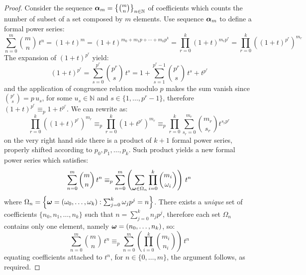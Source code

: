 \begin{proof}
    Consider the sequence $\boldsymbol{\alpha}_{m}=\left\lbrace{{m}\choose{n}}\right\rbrace_{n\in\mathbb{N}}$ 
    of coefficients which counts the number of subset
    of a set composed by $m$ elements. Use sequence $\boldsymbol{\alpha}_{m}$ to define a formal power series:
    \begin{displaymath}
            \sum_{n=0}^{m}{{{m}\choose{n}}\,t^{n}} %
                = \left(1+t\right)^{m}
                = \left(1+t\right)^{m_{0}+m_{1}p+\cdots+m_{k}p^{k}}%
                = \prod_{r=0}^{k}{{\left(1+t\right)^{m_{r}p^{r}}}}
                = \prod_{r=0}^{k}{\left(\left(1+t\right)^{p^{r}}\right)^{m_{r}}}
    \end{displaymath}
    The expansion of $\left(1+t\right)^{p^{r}}$ yield: 
    \begin{displaymath}
            \left(1+t\right)^{p^{r}} = \sum_{s=0}^{p^{r}}{{{p^{r}}\choose{s}}\,t^{s}}
                = 1+\sum_{s=1}^{p^{r}-1}{{{p^{r}}\choose{s}}\,t^{s}}+t^{p^{r}}
    \end{displaymath}
    and the application of congruence relation modulo $p$ makes the sum vanish since ${{p^{r}}\choose{s}}=p\,u_{s}$,
    for some $u_{s}\in\mathbb{N}$ and $s\in\lbrace 1,\ldots,p^{r}-1\rbrace$, 
    therefore $\left(1+t\right)^{p^{r}} \equiv_{p} 1+t^{p^{r}}$. We can rewrite as:
    \begin{displaymath}
            \prod_{r=0}^{k}{\left(\left(1+t\right)^{p^{r}}\right)^{m_{r}}}
                \equiv_{p} \prod_{r=0}^{k}{\left(1+t^{p^{r}}\right)^{m_{r}}}
                \equiv_{p} \prod_{r=0}^{k}{\sum_{s_{r}=0}^{m_{r}}{{{m_{r}}\choose{s_{r}}}t^{s_{r}p^{r}}}}
    \end{displaymath}
    on the very right hand side there is a product of $k+1$ formal power series, properly shifted according to 
    $p_{0},p_{1},\ldots,p_{k}$. Such product yields a new formal power series which satisfies:
    \begin{displaymath}
        \sum_{n=0}^{m}{{{m}\choose{n}}\,t^{n}} 
        \equiv_{p}
        \sum_{n=0}^{m}{\left(\sum_{\boldsymbol{\omega}\in\Omega_{n}}{\prod_{i=0}^{k}{{{m_{i}}\choose{\omega_{i}}}}}\right)\,t^{n}}
    \end{displaymath}
    where $\Omega_{n}=\left\lbrace\boldsymbol{\omega}=\left(\omega_{0},\ldots,\omega_{k}\right):
        \sum_{j=0}^{k}{\omega_{j}p^{j}}=n\right\rbrace$.
    There exists a \emph{unique} set of coefficients
    $\lbrace n_{0},n_{1},\ldots,n_{k}\rbrace$ such that $n=\sum_{j=0}^{k}{n_{j}p^{j}}$, therefore
    each set $\Omega_{n}$ contains only one element, namely $\boldsymbol{\omega}=(n_{0},\ldots,n_{k})$, so:
    \begin{displaymath}
        \sum_{n=0}^{m}{{{m}\choose{n}}\,t^{n}} 
        \equiv_{p} \sum_{n=0}^{m}{\left({\prod_{i=0}^{k}{{{m_{i}}\choose{n_{i}}}}}\right)\,t^{n}}
    \end{displaymath}
    equating coefficients attached to $t^{n}$, for $n\in\lbrace0,\ldots,m\rbrace$, the argument follows, as required.


\end{proof}
